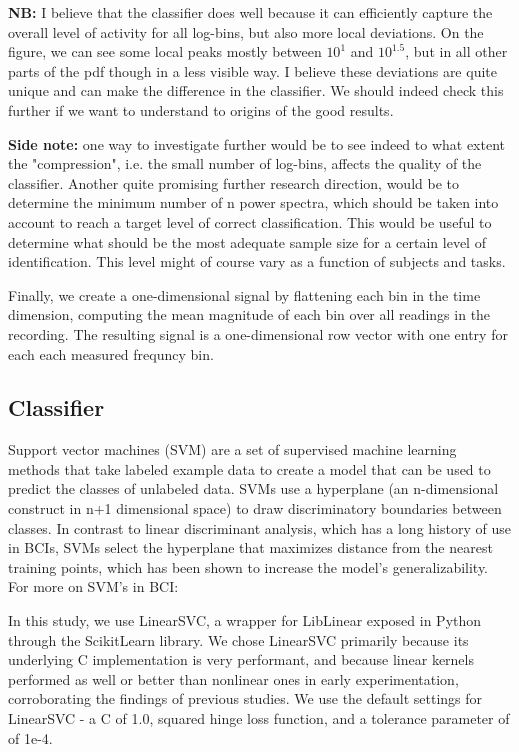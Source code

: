 {\bf NB:} I believe that the classifier does well because it can efficiently capture the overall level of activity for all log-bins, but also more local deviations. On the figure, we can see some local peaks mostly between $10^1$ and $10^1.5$, but in all other parts of the pdf though in a less visible way. I believe these deviations are quite unique and can make the difference in the classifier. We should indeed check this further if we want to understand to origins of the good results.

{\bf Side note:} one way to investigate further would be to see indeed to what extent the "compression", i.e. the small number of log-bins, affects the quality of the classifier. Another quite promising further research direction, would be to determine the minimum number of n power spectra, which should be taken into account to reach a target level of correct classification. This would be useful to determine what should be the most adequate sample size for a certain level of identification. This level might of course vary as a function of subjects and tasks.


Finally, we create a one-dimensional signal by flattening each bin in the time dimension, computing the mean magnitude of each bin over all readings in the recording. The resulting signal is a one-dimensional row vector with one entry for each each measured frequncy bin.


\subsection{Classifier}

Support vector machines (SVM) are a set of supervised machine learning methods that take labeled example data to create a model that can be used to predict the classes of unlabeled data. SVMs use a hyperplane (an n-dimensional construct in n+1 dimensional space) to draw discriminatory boundaries between classes. In contrast to linear discriminant analysis, which has a long history of use in BCIs, SVMs select the hyperplane that maximizes distance from the nearest training points, which has been shown to increase the model's generalizability. \cite{burges_tutorial_1998} For more on SVM's in BCI: \cite{garrett_comparison_2003,grierson_better_2011} 

In this study, we use LinearSVC, \cite{fan_liblinear:_2008} a wrapper for LibLinear exposed in Python through the ScikitLearn library. \cite{pedregosa_scikit-learn:_2011} We chose LinearSVC primarily because its underlying C implementation is very performant, and because linear kernels performed as well or better than nonlinear ones in early experimentation, corroborating the findings of previous studies. \cite{garrett_comparison_2003,lotte_review_2007} We use the default settings for LinearSVC - a C of 1.0, squared hinge loss function, and a tolerance parameter of of 1e-4.


